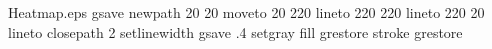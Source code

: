 %
%
%
%
%
\begin{filecontents*}{Heatmap.eps}
gsave
newpath
  20 20 moveto
  20 220 lineto
  220 220 lineto
  220 20 lineto
closepath
2 setlinewidth
gsave
  .4 setgray fill
grestore
stroke
grestore
\end{filecontents*}
%
\RequirePackage{fix-cm}
%
\documentclass[twocolumn,natbib]{svjour3}          %
%
\smartqed  %
%
\usepackage{graphicx}
\usepackage{amssymb}
\usepackage{amsmath}
\usepackage{algorithm}
\usepackage{url}
%
%
%
\newcommand{\T}{{ \top}} %
\newcommand{\ua}{{\bf a}} %
\newcommand{\ub}{{\bf b}} %
\newcommand{\uI}{{\bf I}} %
\newcommand{\uH}{{\bf H}} %
\newcommand{\uX}{{\bf X}} %
\newcommand{\ux}{{\bf x}} %
\newcommand{\uy}{{\bf y}} %
\newcommand{\ud}{{\bf d}} %
\newcommand{\uv}{{\bf v}} %
\newcommand{\uV}{{\bf V}} %
\newcommand{\uu}{{\bf u}} %
\newcommand{\um}{{\bf m}} %
\newcommand{\0}{{\boldsymbol 0}} %
\newcommand{\1}{{\boldsymbol 1}} %
\newcommand{\ubeta}{{\boldsymbol \beta}} %
\newcommand{\ueta}{{\boldsymbol \eta}} %
\newcommand{\umu}{{\boldsymbol \mu}} %
\newcommand{\bg}{{\boldsymbol \gamma}} %
\newcommand{\uepsilon}{{\boldsymbol \epsilon}} %
\newcommand{\uSigma}{{\boldsymbol \Sigma}} %
\newcommand{\diag}{{\rm diag}} %
%
%


